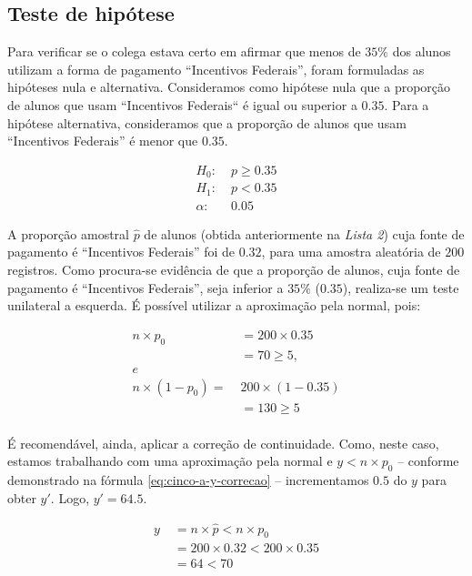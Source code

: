 \subsection{Teste de hipótese}
\label{questao:3a}
Para verificar se o colega estava certo em afirmar que menos de $35\%$ dos alunos utilizam a forma de pagamento ``Incentivos Federais'', 
foram formuladas as hipóteses nula e alternativa.
Consideramos como hipótese nula que a proporção de alunos que usam ``Incentivos Federais`` é igual ou superior a $0.35$. 
Para a hipótese alternativa, consideramos que a proporção de alunos que usam ``Incentivos Federais'' é menor que $0.35$.

\begin{align*}
  H_0\!:   &\; p \geq 0.35 \\
  H_1\!:   &\; p < 0.35  \\
   \alpha\!:&\; 0.05
\end{align*}

A proporção amostral $\hat{p}$ de alunos (obtida anteriormente na \textit{Lista 2}) cuja fonte de pagamento
é ``Incentivos Federais'' foi de $0.32$, para uma amostra aleatória de $200$ registros.
Como procura-se evidência de que a proporção de alunos, cuja fonte de pagamento é ``Incentivos Federais'', 
seja inferior a $35\%$ ($0.35$), realiza-se um teste unilateral a esquerda. É possível utilizar a aproximação pela normal, pois:

\begin{align*}
  n \times p_0\!  &\; = 200 \times 0.35 \\
  &\; = 70 \geq 5 ,\\
  e \\
  n \times (1 - p_0)\!	=   &\;	200 \times (1 - 0.35) \\
  &\;= 130  \geq 5 \\
\end{align*}

É recomendável, ainda, aplicar a correção de continuidade. 
Como, neste caso, estamos trabalhando com uma aproximação pela normal e  
$y < n \times p_0$ – conforme demonstrado na fórmula \ref{eq:cinco-a-y-correcao} – 
incrementamos $0.5$ do $y$ para obter $y'$. Logo, $y' = 64.5$.

\begin{align}
  \label{eq:cinco-a-y-correcao}
  y   &\; =  n \times \hat{p} < n \times p_0 \\ 
      &\; = 200 \times 0.32 < 200 \times 0.35 \nonumber \\
      &\; = 64 < 70 \nonumber
\end{align}


